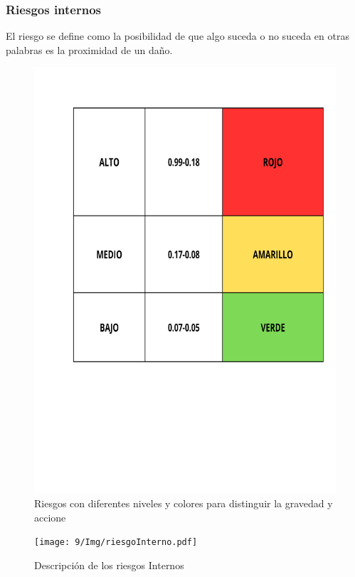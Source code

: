     \subsubsection{Riesgos internos}
    El riesgo se define como la posibilidad de que algo suceda o no suceda en otras palabras es la proximidad de un daño.\cite{H}
    \begin{figure}[H]
        \centering
        \includegraphics[scale=0.3]{9/Img/nivelesRiesgos.pdf}
        \caption{Riesgos con diferentes niveles y colores para distinguir la gravedad y accione}
        \label{fig:mapa-itq}
    \end{figure}
    \begin{figure}[H]
        \centering
        \texttt{[image: 9/Img/riesgoInterno.pdf]}
        \caption{Descripción de los riesgos Internos}
        \label{fig:mapa-itq}
    \end{figure}

